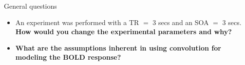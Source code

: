\documentclass{beamer}
\begin{document}
\begin{frame}{General questions}
  \begin{itemize}
    \item An experiment was performed with a TR $=$ 3 secs and an SOA $=$ 3 secs. \textbf{How would you change the experimental parameters and why?}


    \bigskip
    \item \textbf{What are the assumptions inherent in using convolution for modeling the BOLD response?}

  \end{itemize}
\end{frame}

% 
% 
% 
\end{document}
